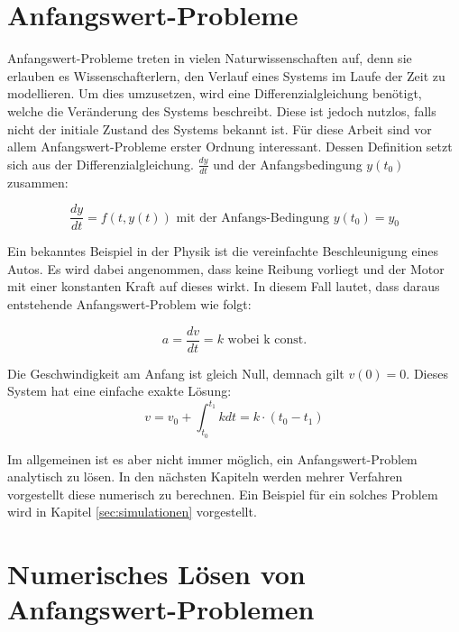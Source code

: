 
\section{Anfangswert-Probleme} \label{sec:anfangswert_probleme}

Anfangswert-Probleme treten in vielen Naturwissenschaften auf, denn sie erlauben es Wissenschafterlern, 
den Verlauf eines Systems im Laufe der Zeit zu modellieren.
Um dies umzusetzen, wird eine Differenzialgleichung benötigt, welche die Veränderung des Systems beschreibt.
Diese ist jedoch nutzlos, falls nicht der initiale Zustand des Systems bekannt ist.
Für diese Arbeit sind vor allem Anfangswert-Probleme erster Ordnung interessant.
Dessen Definition setzt sich aus der Differenzialgleichung. $\frac{dy}{dt}$ und der Anfangsbedingung $y(t_0)$ zusammen:

$$
\frac{dy}{dt} = f(t, y(t)) \text{ mit der Anfangs-Bedingung } y(t_0) = y_0
$$

Ein bekanntes Beispiel in der Physik ist die vereinfachte Beschleunigung eines Autos.
Es wird dabei angenommen, dass keine Reibung vorliegt und der Motor mit einer konstanten Kraft auf dieses wirkt.
In diesem Fall lautet, dass daraus entstehende Anfangswert-Problem wie folgt:

$$
a = \frac{dv}{dt} = k \text{ wobei k const.}
$$

Die Geschwindigkeit am Anfang ist gleich Null, demnach gilt  $v(0) = 0$.
Dieses System hat eine einfache exakte Lösung:
$$
v = v_0 + \int_{t_0}^{t_1} k dt = k \cdot (t_0 - t_1) 
$$

Im allgemeinen ist es aber nicht immer möglich, 
ein Anfangswert-Problem analytisch zu lösen. 
In den nächsten Kapiteln werden mehrer Verfahren vorgestellt diese numerisch zu berechnen.
Ein Beispiel für ein solches Problem wird in Kapitel \ref{sec:simulationen} vorgestellt.

\section{Numerisches Lösen von Anfangswert-Problemen} \label{sec:numerisches_lösen_von_anfangswert_problemen}


